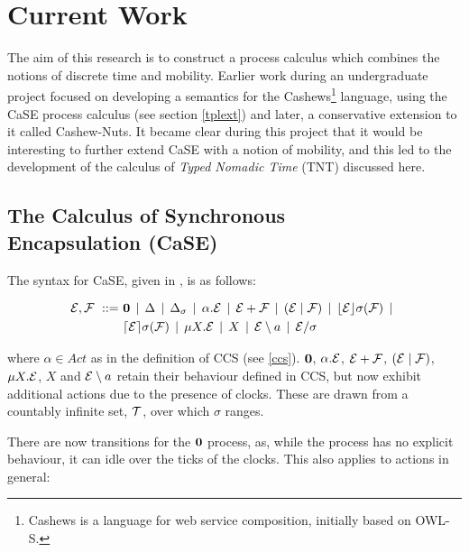 \chapter{Current Work}
\label{currentwork}

The aim of this research is to construct a process calculus which
combines the notions of discrete time and mobility.  Earlier work
during an undergraduate project focused on developing a semantics for
the Cashews\footnote{Cashews is a language for web service
  composition, initially based on OWL-S.}\cite{cashews-sem} language,
using the CaSE process calculus (see section \ref{tplext}) and later,
a conservative extension to it called Cashew-Nuts.  It became clear
during this project that it would be interesting to further extend CaSE
with a notion of mobility, and this led to the development of the
calculus of \emph{Typed Nomadic Time} (TNT) discussed here.

\section{The Calculus of Synchronous \\ Encapsulation (CaSE)}
\label{case}

The syntax for CaSE, given in \cite{norton05alg}, is as follows:

\begin{equation}
  \begin{aligned}
    \text{$\mathcal{E}$}, \text{$\mathcal{F}$}\ ::=\ &
    \textbf{0}  \;\,|\,\; 
    \Delta \;\,|\,\; 
    \Delta_{\sigma} \;\,|\,\; 
    \alpha . \text{$\mathcal{E}$}  \;\,|\,\;
    \text{$\mathcal{E}$} + \text{$\mathcal{F}$} \;\,|\,\; 
    (\text{$\mathcal{E}$}\;|\;\text{$\mathcal{F}$})\;\,|\,\; 
    \lfloor{\text{$\mathcal{E}$}}\rfloor {\sigma} ({\text{$\mathcal{F}$}}) \;\,|\,\; \\
    & \lceil{\text{$\mathcal{E}$}}\rceil {\sigma} ({\text{$\mathcal{F}$}}) \;\,|\,\; 
    \mu X . \text{$\mathcal{E}$} \;\,|\,\; 
    X \;\,|\,\; 
    \text{$\mathcal{E}$} \setminus a \;\,|\,\; 
    \text{$\mathcal{E}$} / \sigma
  \end{aligned}
\end{equation}

\noindent where $\alpha \in Act$ as in the definition of CCS (see \ref{ccs}).
$\textbf{0}$, $\alpha.\text{$\mathcal{E}$}$, $\text{$\mathcal{E}$} + \text{$\mathcal{F}$}$, $(\text{$\mathcal{E}$}\;|\;\text{$\mathcal{F}$})$, $\mu X
. \text{$\mathcal{E}$}$, $X$ and $\text{$\mathcal{E}$} \setminus a$ retain their behaviour defined in
CCS, but now exhibit additional actions due to the presence of clocks.
These are drawn from a countably infinite set, $\text{$\mathcal{T}$}$, over which
$\sigma$ ranges.

There are now transitions for the $\textbf{0}$ process, as, while the
process has no explicit behaviour, it can idle over the ticks of the
clocks.  This also applies to actions in general:

